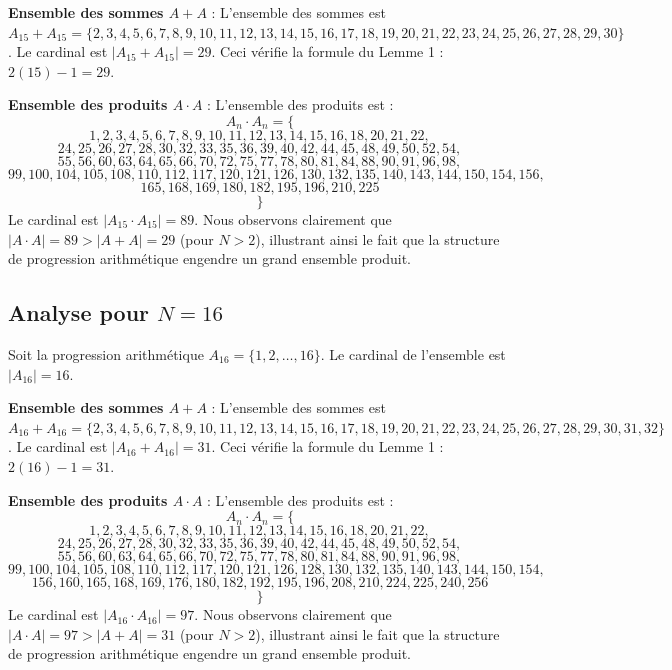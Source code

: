 \documentclass[11pt,a4paper]{article}
\begin{document}
\textbf{Ensemble des sommes $A+A$} :
L'ensemble des sommes est $A_{15} + A_{15} = \{2, 3, 4, 5, 6, 7, 8, 9, 10, 11, 12, 13, 14, 15, 16, 17, 18, 19, 20, 21, 22, 23, 24, 25, 26, 27, 28, 29, 30\} $. Le cardinal est $|A_{15} + A_{15}| = 29$. Ceci vérifie la formule du Lemme 1 : $2(15) - 1 = 29$.

\textbf{Ensemble des produits $A \cdot A$} :
L'ensemble des produits est :
$$ A_{{{n}}} \cdot A_{{{n}}} = \{ $$$$ 1, 2, 3, 4, 5, 6, 7, 8, 9, 10, 11, 12, 13, 14, 15, 16, 18, 20, 21, 22, $$$$ 24, 25, 26, 27, 28, 30, 32, 33, 35, 36, 39, 40, 42, 44, 45, 48, 49, 50, 52, 54, $$$$ 55, 56, 60, 63, 64, 65, 66, 70, 72, 75, 77, 78, 80, 81, 84, 88, 90, 91, 96, 98, $$$$ 99, 100, 104, 105, 108, 110, 112, 117, 120, 121, 126, 130, 132, 135, 140, 143, 144, 150, 154, 156, $$$$ 165, 168, 169, 180, 182, 195, 196, 210, 225 $$$$ \} $$
Le cardinal est $|A_{15} \cdot A_{15}| = 89$.
Nous observons clairement que $|A \cdot A| = 89 > |A+A| = 29$ (pour $N > 2$), illustrant ainsi le fait que la structure de progression arithmétique engendre un grand ensemble produit.
\newpage

\subsection{Analyse pour $N = 16$}
Soit la progression arithmétique $A_{16} = \{1, 2, \dots, 16\} $. Le cardinal de l'ensemble est $|A_{16}| = 16$.

\textbf{Ensemble des sommes $A+A$} :
L'ensemble des sommes est $A_{16} + A_{16} = \{2, 3, 4, 5, 6, 7, 8, 9, 10, 11, 12, 13, 14, 15, 16, 17, 18, 19, 20, 21, 22, 23, 24, 25, 26, 27, 28, 29, 30, 31, 32\} $. Le cardinal est $|A_{16} + A_{16}| = 31$. Ceci vérifie la formule du Lemme 1 : $2(16) - 1 = 31$.

\textbf{Ensemble des produits $A \cdot A$} :
L'ensemble des produits est :
$$ A_{{{n}}} \cdot A_{{{n}}} = \{ $$$$ 1, 2, 3, 4, 5, 6, 7, 8, 9, 10, 11, 12, 13, 14, 15, 16, 18, 20, 21, 22, $$$$ 24, 25, 26, 27, 28, 30, 32, 33, 35, 36, 39, 40, 42, 44, 45, 48, 49, 50, 52, 54, $$$$ 55, 56, 60, 63, 64, 65, 66, 70, 72, 75, 77, 78, 80, 81, 84, 88, 90, 91, 96, 98, $$$$ 99, 100, 104, 105, 108, 110, 112, 117, 120, 121, 126, 128, 130, 132, 135, 140, 143, 144, 150, 154, $$$$ 156, 160, 165, 168, 169, 176, 180, 182, 192, 195, 196, 208, 210, 224, 225, 240, 256 $$$$ \} $$
Le cardinal est $|A_{16} \cdot A_{16}| = 97$.
Nous observons clairement que $|A \cdot A| = 97 > |A+A| = 31$ (pour $N > 2$), illustrant ainsi le fait que la structure de progression arithmétique engendre un grand ensemble produit.
\newpage
\end{document}
